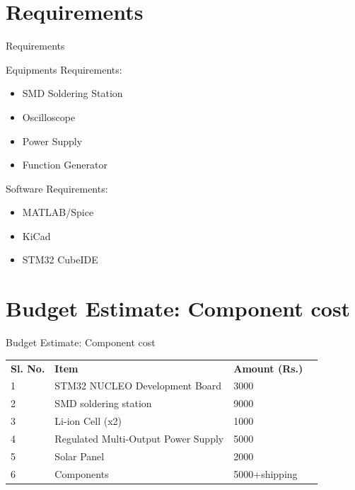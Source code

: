 \documentclass[aspectratio=169]{beamer}
\begin{document}
\section{Requirements}
\begin{frame}{Requirements}
	\begin{minipage}{0.5\textwidth}
		Equipments Requirements:
		\begin{itemize}
			
			\item SMD Soldering Station
			\item Oscilloscope
			\item Power Supply
			\item Function Generator
		\end{itemize} 
	\end{minipage}
	\begin{minipage}{0.3\textwidth}
		Software Requirements:
		\begin{itemize}
			
			\item MATLAB/Spice
			\item KiCad
			\item STM32 CubeIDE
			
		\end{itemize} 
		
	\end{minipage}
\end{frame}



\section{Budget Estimate: Component cost}
\begin{frame}{Budget Estimate: Component cost}

\begin{table}[]
	\begin{tabular}{|l|l|l|l}
		\cline{1-3}
		\textbf{Sl. No.} & \textbf{Item}                       & \textbf{Amount (Rs.)} &  \\ \cline{1-3}
		1                & STM32 NUCLEO Development Board      & 3000                  &  \\ \cline{1-3}
		2                & SMD soldering station               & 9000                  &  \\ \cline{1-3}
		3                & Li-ion Cell (x2)                  & 1000                  &  \\ \cline{1-3}
		4                & Regulated Multi-Output Power Supply & 5000                  &  \\ \cline{1-3}
		5                & Solar Panel                         & 2000                    &  \\ \cline{1-3}
		6                & Components                          & 5000+shipping         &  \\ \cline{1-3}
	\end{tabular}
\end{table}

		

\end{frame}
\end{document}
